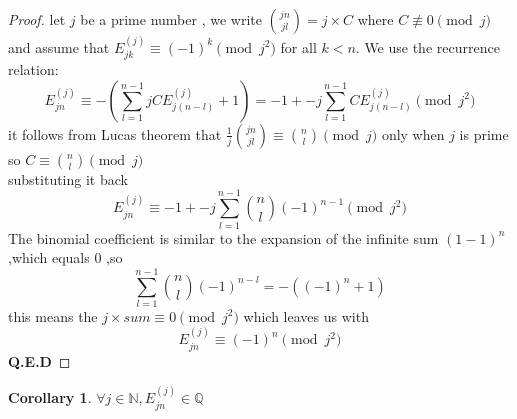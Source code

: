\documentclass{article}
\newtheorem{corollary}{Corollary}
\begin{document}
\begin{proof}
let $j$ be a prime number , we write $\binom{jn}{jl}=j\times C$ where $C \not \equiv 0 \pmod j$ and assume that $E_{jk}^{(j)}\equiv (-1)^{k} \pmod {j^2}$ for all \(k<n\). We use the recurrence relation:\\
\[E^{(j)}_{jn} \equiv -(\sum_{l=1}^{n-1} j CE^{(j)}_{j(n-l)} +1) = -1+ -j\sum_{l=1}^{n-1} CE^{(j)}_{j(n-l)}\pmod{j^2}\]
it follows from Lucas theorem that $\frac{1}{j}\binom{jn}{jl} \equiv \binom{n}{l} \pmod{j}$ only when $j$ is prime so $C \equiv \binom{n}{l} \pmod{j}$\\
substituting it back 
\[E^{(j)}_{jn} \equiv -1+ -j\sum_{l=1}^{n-1} \binom{n}{l}(-1)^{n-1}\pmod{j^2}\] 
The binomial coefficient is similar to the expansion of the infinite sum $(1-1)^n$ ,which equals $0$ ,so
\[\sum_{l=1}^{n-1} \binom{n}{l}(-1)^{n-l} = -((-1)^n + 1)\]
this means the $j\times sum \equiv 0 \pmod{j^2}$
which leaves us with 
\[E^{(j)}_{jn} \equiv (-1)^n \pmod{j^2}\]
\textbf{Q.E.D}
\end{proof}

\begin{corollary}
    $\forall j\in \mathbb{N},E^{(j)}_{jn}\in \mathbb{Q}$ 
\end{corollary}
\end{document}
